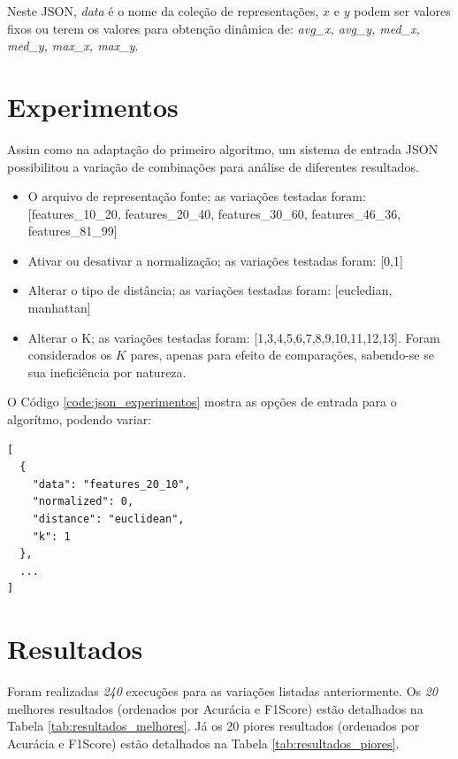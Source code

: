 \documentclass[12pt]{article}
\begin{document}
Neste JSON, \textit{data} é o nome da coleção de representações, $x$ e $y$ podem ser valores fixos ou terem os valores para obtenção dinâmica de: \textit{avg\_x, avg\_y, med\_x, med\_y, max\_x, max\_y}.

\section{Experimentos}

Assim como na adaptação do primeiro algoritmo, um sistema de entrada JSON possibilitou a variação de combinações para análise de diferentes resultados.

\begin{itemize}
  \item O arquivo de representação fonte; as variações testadas foram: [features\_10\_20, features\_20\_40, features\_30\_60, features\_46\_36, features\_81\_99]
  \item Ativar ou desativar a normalização; as variações testadas foram: [0,1]
  \item Alterar o tipo de distância; as variações testadas foram: [eucledian, manhattan]
  \item Alterar o K; as variações testadas foram: [1,3,4,5,6,7,8,9,10,11,12,13]. Foram considerados os $K$ pares, apenas para efeito de comparações, sabendo-se se sua ineficiência por natureza.
\end{itemize}

\newpage

O Código \ref{code:json_experimentos} mostra as opções de entrada para o algorítmo, podendo variar:

\begin{lstlisting}[caption={JSON para experimentos},captionpos=b,frame=single,label={code:json_experimentos}]
[
  {
    "data": "features_20_10",
    "normalized": 0,
    "distance": "euclidean",
    "k": 1
  },
  ...
]
\end{lstlisting}

\section{Resultados}

Foram realizadas \textit{240} execuções para as variações listadas anteriormente. Os \textit{20} melhores resultados (ordenados por Acurácia e F1Score) estão detalhados na Tabela \ref{tab:resultados_melhores}. Já os 20 piores resultados (ordenados por Acurácia e F1Score) estão detalhados na Tabela \ref{tab:resultados_piores}.
\end{document}
